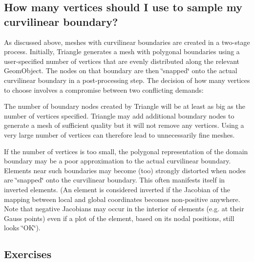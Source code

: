 \hypertarget{index_how_many_segments}{}\subsection{How many vertices should I use to sample my curvilinear boundary?}\label{index_how_many_segments}
As discussed above, meshes with curvilinear boundaries are created in a two-\/stage process. Initially, Triangle generates a mesh with polygonal boundaries using a user-\/specified number of vertices that are evenly distributed along the relevant {\ttfamily Geom\+Object}. The nodes on that boundary are then \char`\"{}snapped\char`\"{} onto the actual curvilinear boundary in a post-\/processing step. The decision of how many vertices to choose involves a compromise between two conflicting demands\+:
\begin{DoxyItemize}
\item The number of boundary nodes created by Triangle will be at least as big as the number of vertices specified. Triangle may add additional boundary nodes to generate a mesh of sufficient quality but it will not remove any vertices. Using a very large number of vertices can therefore lead to unnecessarily fine meshes. ~\newline
~\newline

\item If the number of vertices is too small, the polygonal representation of the domain boundary may be a poor approximation to the actual curvilinear boundary. Elements near such boundaries may become (too) strongly distorted when nodes are \char`\"{}snapped\char`\"{} onto the curvilinear boundary. This often manifests itself in inverted elements. (An element is considered inverted if the Jacobian of the mapping between local and global coordinates becomes non-\/positive anywhere. Note that negative Jacobians may occur in the interior of elements (e.\+g. at their Gauss points) even if a plot of the element, based on its nodal positions, still looks \char`\"{}\+O\+K\char`\"{}).
\end{DoxyItemize}

\hypertarget{index_ex}{}\subsection{Exercises}\label{index_ex}

